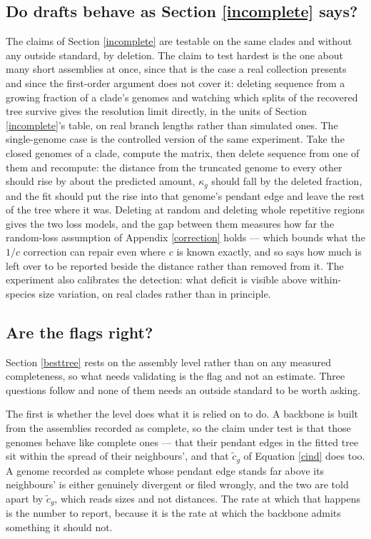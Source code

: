 \documentclass[pdflatex,sn-vancouver-num]{sn-jnl}
\begin{document}
    \subsection{Do drafts behave as Section \ref{incomplete} says?}

The claims of Section \ref{incomplete} are testable on the same clades and without any outside
standard, by deletion. The claim to test hardest is the one about many short assemblies at once,
since that is the case a real collection presents and since the first-order argument does not cover
it: deleting sequence from a growing fraction of a clade's genomes and watching which splits of the
recovered tree survive gives the resolution limit directly, in the units of Section \ref{incomplete}'s
table, on real branch lengths rather than simulated ones. The single-genome case is the controlled
version of the same experiment. Take the closed genomes of a clade, compute the matrix, then delete
sequence from one of them and recompute: the distance from the truncated genome to every other should rise by
about the predicted amount, $\kappa_g$ should fall by the deleted fraction, and the fit should put the
rise into that genome's pendant edge and leave the rest of the tree where it was. Deleting at random
and deleting whole repetitive regions gives the two loss models, and the gap between them measures
how far the random-loss assumption of Appendix \ref{correction} holds --- which bounds what the
$1/c$ correction can repair even where $c$ is known exactly, and so says how much is left over to be
reported beside the distance rather than removed from it. The experiment also calibrates the detection: what deficit is visible
above within-species size variation, on real clades rather than in principle.

    \subsection{Are the flags right?}\label{cvalid}

Section \ref{besttree} rests on the assembly level rather than on any measured completeness, so what
needs validating is the flag and not an estimate. Three questions follow and none of them needs an
outside standard to be worth asking.

The first is whether the level does what it is relied on to do. A backbone is built from the
assemblies recorded as complete, so the claim under test is that those genomes behave like complete
ones --- that their pendant edges in the fitted tree sit within the spread of their neighbours', and
that $\tilde{c}_g$ of Equation \eqref{cind} does too. A genome recorded as complete whose pendant edge
stands far above its neighbours' is either genuinely divergent or filed wrongly, and the two are told
apart by $\tilde{c}_g$, which reads sizes and not distances. The rate at which that happens is the number to
report, because it is the rate at which the backbone admits something it should not.
\end{document}
